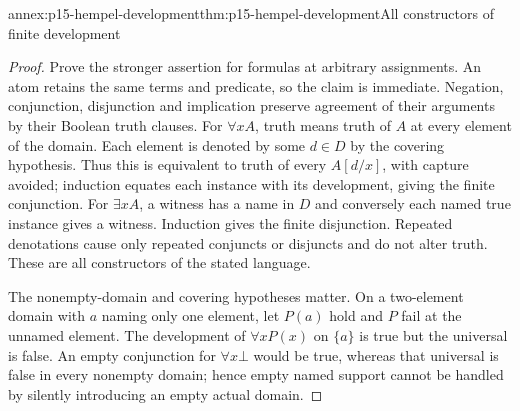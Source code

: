 \begin{annexitem}{annex:p15-hempel-development}{thm:p15-hempel-development}{All constructors of finite development}
\begin{proof}
Prove the stronger assertion for formulas at arbitrary assignments.
An atom retains the same terms and predicate, so the claim is immediate.
Negation, conjunction, disjunction and implication preserve agreement
of their arguments by their Boolean truth clauses. For $\forall xA$,
truth means truth of $A$ at every element of the domain. Each element
is denoted by some $d\in D$ by the covering hypothesis. Thus this is
equivalent to truth of every $A[d/x]$, with capture avoided; induction
equates each instance with its development, giving the finite conjunction.
For $\exists xA$, a witness has a name in $D$ and conversely each named
true instance gives a witness. Induction gives the finite disjunction.
Repeated denotations cause only repeated conjuncts or disjuncts and do
not alter truth. These are all constructors of the stated language.

The nonempty-domain and covering hypotheses matter. On a two-element
domain with $a$ naming only one element, let $P(a)$ hold and $P$ fail
at the unnamed element. The development of $\forall xP(x)$ on $\{a\}$
is true but the universal is false. An empty conjunction for
$\forall x\bot$ would be true, whereas that universal is false in
every nonempty domain; hence empty named support cannot be handled by
silently introducing an empty actual domain.
\end{proof}
\end{annexitem}

